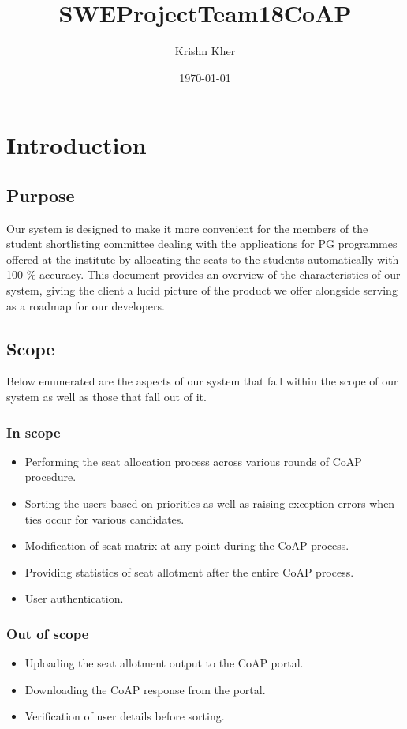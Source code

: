 \documentclass{report}
\title{SWEProjectTeam18CoAP}
\author{Krishn Kher}
\date{\today}
\begin{document}
\setlength{\footskip}{50pt}
\BgThispage

\tableofcontents
\clearpage

\chapter{Introduction}
\section{Purpose}
\begin{tcolorbox}[colframe=white, colback=lightblue, arc=8pt] Our system is designed to make it more convenient for the members of the student shortlisting committee dealing with the applications for PG programmes offered at the institute by allocating the seats to the students automatically with 100 \% accuracy.
This document provides an overview of the characteristics of our system, giving the client a lucid picture of the product we offer alongside serving as a roadmap for our developers. \end{tcolorbox}

\section{Scope}
Below enumerated are the aspects of our system that fall within the scope of our system as well as those that fall out of it.
\subsection{In scope}
\begin{tcolorbox}[colframe=white, colback=lightgreen, arc=8pt]
\begin{itemize}
    \item Performing the seat allocation process across various rounds of CoAP procedure.
    \item Sorting the users based on priorities as well as raising exception errors when ties occur for various candidates.
    \item Modification of seat matrix at any point during the CoAP process.
    \item Providing statistics of seat allotment after the entire CoAP process.
    \item User authentication.
\end{itemize}
\end{tcolorbox}
\subsection{Out of scope}
\begin{tcolorbox}[colframe=white, colback=lightred, arc=8pt]
\begin{itemize}
    \item Uploading the seat allotment output to the CoAP portal.
    \item Downloading the CoAP response from the portal.
    \item Verification of user details before sorting.
\end{itemize}
\end{tcolorbox}
\end{document}
